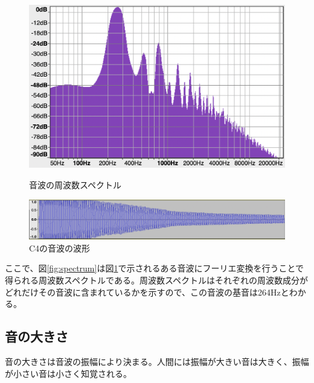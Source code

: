 \begin{figure}[t]
\begin{center}
\begin{minipage}{0.48\hsize}
\begin{center}
\includegraphics[width=0.95\hsize]{figure/c4_harp_spectrum.png}
\caption{音波の周波数スペクトル}
\label{fig:spectrum}
\end{center}
\end{minipage}
\begin{minipage}{0.48\hsize}
\begin{center}
\includegraphics[width=0.95\hsize]{figure/c4_harp_wav.png}
\caption{C4の音波の波形}
\label{fig:wav}
\end{center}
\end{minipage}
\end{center}
\end{figure}

ここで、図\ref{fig:spectrum}は図\ref{fig:wav}で示されるある音波にフーリエ変換を行うことで得られる周波数スペクトルである。周波数スペクトルはそれぞれの周波数成分がどれだけその音波に含まれているかを示すので、この音波の基音は264Hzとわかる。

\subsection{音の大きさ}

音の大きさは音波の振幅により決まる。人間には振幅が大きい音は大きく、振幅が小さい音は小さく知覚される。

